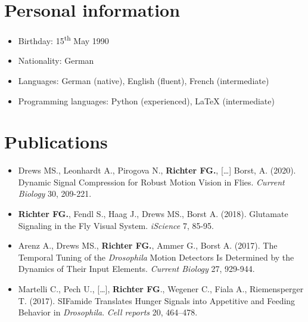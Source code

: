 \section*{Personal information}

\begin{itemize}
     \item Birthday: 15\textsuperscript{th} May 1990
     \item Nationality: German
     \item Languages: German (native), English (fluent), French (intermediate)
     \item Programming languages: Python (experienced), LaTeX (intermediate)
\end{itemize}

\section*{Publications}

\begin{itemize}

    \item Drews MS., Leonhardt A., Pirogova N., \textbf{Richter FG.}, […] Borst, A. (2020). Dynamic Signal Compression for Robust Motion Vision in Flies. \textit{Current Biology} 30, 209-221.
     
    \item \textbf{Richter FG.}, Fendl S., Haag J., Drews MS., Borst A. (2018). Glutamate Signaling in the Fly Visual System. \textit{iScience} 7, 85-95.
    
    \item Arenz A., Drews MS., \textbf{Richter FG.}, Ammer G., Borst A. (2017). The Temporal Tuning of the \textit{Drosophila} Motion Detectors Is Determined by the Dynamics of Their Input Elements. \textit{Current Biology} 27, 929-944.
    
    \item Martelli C., Pech U., […], \textbf{Richter FG}., Wegener C., Fiala A., Riemensperger T. (2017). SIFamide Translates Hunger Signals into Appetitive and Feeding Behavior in \textit{Drosophila}. \textit{Cell reports} 20, 464–478.
        
    
\end{itemize}
